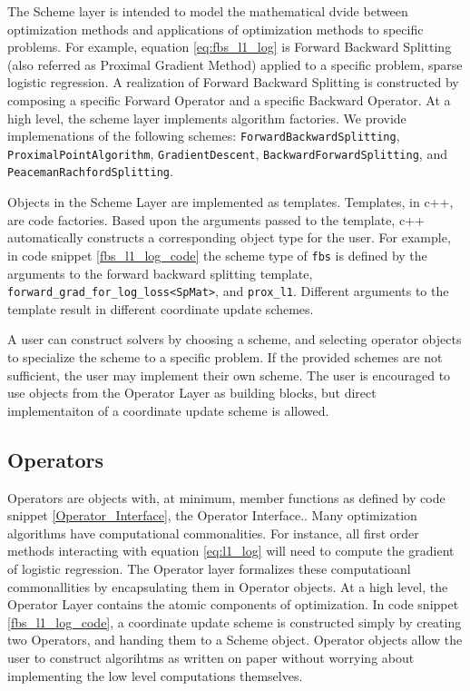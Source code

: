 The Scheme layer is intended to model the mathematical dvide between optimization methods and applications of optimization methods to specific problems.
 For example, equation \ref{eq:fbs_l1_log} is Forward Backward Splitting (also referred as Proximal Gradient Method) applied to a specific problem, sparse logistic regression.
 A realization of  Forward Backward Splitting is constructed by composing a specific  Forward Operator and a specific Backward Operator.
 At a high level, the scheme layer implements algorithm factories.
 We provide implemenations of the following schemes: \texttt{ForwardBackwardSplitting}, \texttt{ProximalPointAlgorithm},  \texttt{GradientDescent}, \texttt{BackwardForwardSplitting}, and \texttt{PeacemanRachfordSplitting}.

Objects in the Scheme Layer are implemented as templates.
Templates, in c++, are code factories.
 Based upon the arguments passed to the template, c++ automatically constructs a corresponding object type for the user.
For example, in code snippet \ref{fbs_l1_log_code} the scheme type of \texttt{fbs} is defined by the arguments to the forward backward splitting template, \texttt{forward\_grad\_for\_log\_loss<SpMat>}, and \texttt{prox\_l1}. 
 Different arguments to the template result in different coordinate update schemes.

A user can construct solvers by choosing a scheme, and selecting operator objects to specialize the scheme to a specific problem. 
If the provided schemes are not sufficient, the user may implement their own scheme.
The user is encouraged to use objects from the Operator Layer as building blocks, but direct implementaiton of a coordinate update scheme is allowed.

\subsection{Operators}

Operators are objects with, at minimum, member functions as defined by code snippet \ref{Operator_Interface}, the Operator Interface..
Many optimization algorithms  have computational commonalities.
For instance, all first order methods interacting with equation \ref{eq:l1_log} will need to compute the gradient of logistic regression.
The Operator layer formalizes these computatioanl commonallities by encapsulating them in Operator objects.
At a high level, the Operator Layer contains the atomic components of optimization.
In code snippet \ref{fbs_l1_log_code}, a coordinate update scheme is constructed simply by creating two Operators, and handing them to a Scheme object.
Operator objects allow the user to construct algorihtms as written on paper without worrying about implementing the low level computations themselves.

